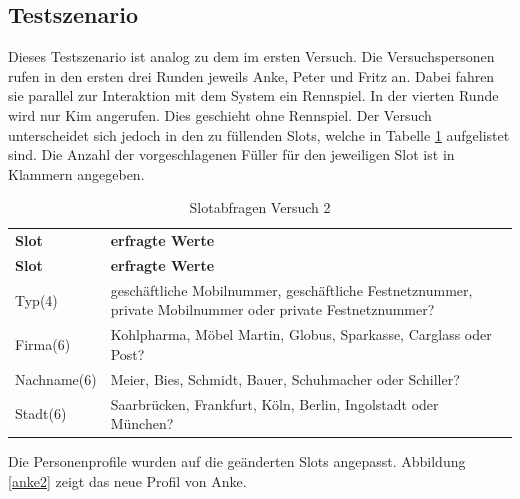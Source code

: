 \documentclass[12pt,a4paper]{scrartcl}
\begin{document}
\subsection{Testszenario}
Dieses Testszenario ist analog zu dem im ersten Versuch. Die Versuchspersonen rufen in den ersten drei Runden jeweils Anke, Peter und Fritz an. Dabei fahren sie parallel zur Interaktion mit dem System ein Rennspiel. In der vierten Runde wird nur Kim angerufen. Dies geschieht ohne Rennspiel. Der Versuch unterscheidet sich jedoch in den zu füllenden Slots, welche in Tabelle \ref{slots2} aufgelistet sind. Die Anzahl der vorgeschlagenen Füller für den jeweiligen Slot ist in Klammern angegeben.
\newpage


\begin{longtable}{p{4cm}p{10cm}}
	\label{slots2}\\
	\caption[Slotabfragen Versuch 2]{Slotabfragen Versuch 2}\\
	\hline
	\textbf{Slot} &\textbf{erfragte Werte}\\
	\hline
	\endfirsthead
	\hline
	\textbf{Slot} &	\textbf{erfragte Werte}\\
	\hline
	\endhead
Typ(4) & geschäftliche Mobilnummer, geschäftliche Festnetznummer, private Mobilnummer oder private Festnetznummer?\\
Firma(6) & Kohlpharma, Möbel Martin, Globus, Sparkasse, Carglass oder Post?\\
Nachname(6) & Meier, Bies, Schmidt, Bauer, Schuhmacher oder Schiller?\\
Stadt(6) & Saarbrücken, Frankfurt, Köln, Berlin, Ingolstadt oder München?\\
\hline
\end{longtable}
\newpage

Die Personenprofile wurden auf die geänderten Slots angepasst. Abbildung \ref{anke2} zeigt das neue Profil von Anke. 
\end{document}
